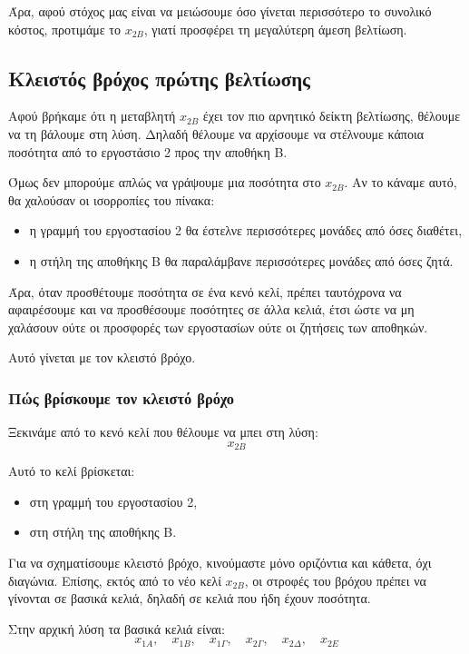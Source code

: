 \documentclass[12pt,a4paper]{article}
\begin{document}
Άρα, αφού στόχος μας είναι να μειώσουμε όσο γίνεται περισσότερο το συνολικό κόστος, προτιμάμε το \(x_{2B}\), γιατί προσφέρει τη μεγαλύτερη άμεση βελτίωση.

\subsection{Κλειστός βρόχος πρώτης βελτίωσης}

Αφού βρήκαμε ότι η μεταβλητή \(x_{2B}\) έχει τον πιο αρνητικό δείκτη βελτίωσης, θέλουμε να τη βάλουμε στη λύση. Δηλαδή θέλουμε να αρχίσουμε να στέλνουμε κάποια ποσότητα από το εργοστάσιο 2 προς την αποθήκη Β.

Όμως δεν μπορούμε απλώς να γράψουμε μια ποσότητα στο \(x_{2B}\). Αν το κάναμε αυτό, θα χαλούσαν οι ισορροπίες του πίνακα:

\begin{itemize}
    \item η γραμμή του εργοστασίου 2 θα έστελνε περισσότερες μονάδες από όσες διαθέτει,
    \item η στήλη της αποθήκης Β θα παραλάμβανε περισσότερες μονάδες από όσες ζητά.
\end{itemize}

Άρα, όταν προσθέτουμε ποσότητα σε ένα κενό κελί, πρέπει ταυτόχρονα να αφαιρέσουμε και να προσθέσουμε ποσότητες σε άλλα κελιά, έτσι ώστε να μη χαλάσουν ούτε οι προσφορές των εργοστασίων ούτε οι ζητήσεις των αποθηκών.

Αυτό γίνεται με τον κλειστό βρόχο.

\subsubsection*{Πώς βρίσκουμε τον κλειστό βρόχο}

Ξεκινάμε από το κενό κελί που θέλουμε να μπει στη λύση:
\[
x_{2B}
\]

Αυτό το κελί βρίσκεται:

\begin{itemize}
    \item στη γραμμή του εργοστασίου 2,
    \item στη στήλη της αποθήκης Β.
\end{itemize}

Για να σχηματίσουμε κλειστό βρόχο, κινούμαστε μόνο οριζόντια και κάθετα, όχι διαγώνια. Επίσης, εκτός από το νέο κελί \(x_{2B}\), οι στροφές του βρόχου πρέπει να γίνονται σε βασικά κελιά, δηλαδή σε κελιά που ήδη έχουν ποσότητα.

Στην αρχική λύση τα βασικά κελιά είναι:
\[
x_{1A},\quad x_{1B},\quad x_{1\Gamma},\quad x_{2\Gamma},\quad x_{2\Delta},\quad x_{2E}
\]
\end{document}
